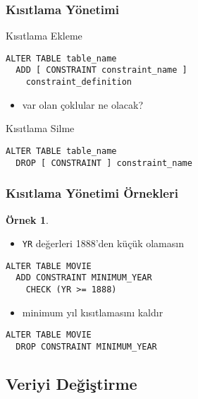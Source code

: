 \documentclass[dvipsnames]{beamer}
\theoremstyle{definition}
\theoremstyle{example}
\newtheorem{ornek}[theorem]{Örnek}
\theoremstyle{plain}
\begin{document}
\begin{frame}[fragile]
  \frametitle{Kısıtlama Yönetimi}

  \begin{block}{Kısıtlama Ekleme}
    \begin{lstlisting}
ALTER TABLE table_name
  ADD [ CONSTRAINT constraint_name ]
    constraint_definition
    \end{lstlisting}
  \end{block}

  \pause
  \begin{itemize}
    \item var olan çoklular ne olacak?
  \end{itemize}

  \pause
  \begin{block}{Kısıtlama Silme}
    \begin{lstlisting}
ALTER TABLE table_name
  DROP [ CONSTRAINT ] constraint_name
    \end{lstlisting}
  \end{block}
\end{frame}

\begin{frame}[fragile]
  \frametitle{Kısıtlama Yönetimi Örnekleri}

  \begin{ornek}
    \begin{itemize}
      \item \texttt{YR} değerleri 1888'den küçük olamasın
    \end{itemize}

    \begin{lstlisting}
ALTER TABLE MOVIE
  ADD CONSTRAINT MINIMUM_YEAR
    CHECK (YR >= 1888)
    \end{lstlisting}

    \pause
    \begin{itemize}
      \item minimum yıl kısıtlamasını kaldır
    \end{itemize}

    \begin{lstlisting}
ALTER TABLE MOVIE
  DROP CONSTRAINT MINIMUM_YEAR
    \end{lstlisting}
  \end{ornek}
\end{frame}

\subsection{Veriyi Değiştirme}
\end{document}
